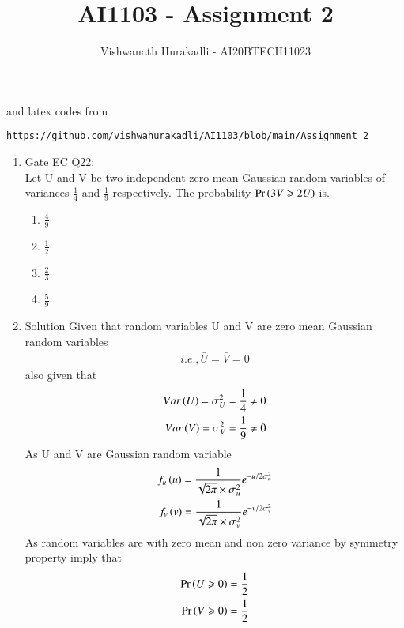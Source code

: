 \documentclass[journal,12pt,twocolumn]{IEEEtran}
\begin{document}
     \def\centbox#1{\makebox[0in]{#1}}
     \def\topbox#1{\raisebox{-\baselineskip}[0in][0in]{#1}}
     \def\midbox#1{\raisebox{-0.5\baselineskip}[0in][0in]{#1}}
\vspace{3cm}
\title{AI1103 - Assignment 2}
\author{Vishwanath Hurakadli - AI20BTECH11023}
\maketitle
\newpage
\bigskip
\renewcommand{\thefigure}{\theenumi}
\renewcommand{\thetable}{\theenumi}
%
and latex codes from 
%
\begin{lstlisting}
https://github.com/vishwahurakadli/AI1103/blob/main/Assignment_2
\end{lstlisting}
\begin{enumerate}
\item Gate EC Q22:\\
Let U and V be two independent zero mean Gaussian random variables of variances \(\frac{1}{4}\) and \(\frac{1}{9}\) respectively. The probability \(\Pr\left(3V\geqslant2U\right)\) is.
\begin{enumerate}
\item \(\frac{4}{9}\)
\item \(\frac{1}{2}\)
\item \(\frac{2}{3}\)
\item \(\frac{5}{9}\)
\end{enumerate}
\item Solution
Given that random variables U and V are zero mean Gaussian random variables
\begin{align}
i.e., \bar{U}=\bar{V}=0 
\end{align}
also given that
\begin{align}
 Var\left(U\right)=\sigma^2_U=\frac{1}{4} \neq 0\\                                 Var\left(V\right)=\sigma^2_V=\frac{1}{9} \neq 0
\end{align}
As U and V are Gaussian random variable
\begin{align}
f_u\left(u\right)=\frac{1}{\sqrt{2\pi}\times\sigma^2_u}e^{{-u}/{2\sigma^2_u}}\\
f_v\left(v\right)=\frac{1}{\sqrt{2\pi}\times\sigma^2_v}e^{{-v}/{2\sigma^2_v}}
\end{align}
As random variables are with zero mean and non zero variance by symmetry property imply that
\begin{align}
\Pr\left(U\geqslant0\right)=\frac{1}{2}\\
\Pr\left(V\geqslant0\right)=\frac{1}{2}
\end{align}

\end{enumerate}
\end{document}
